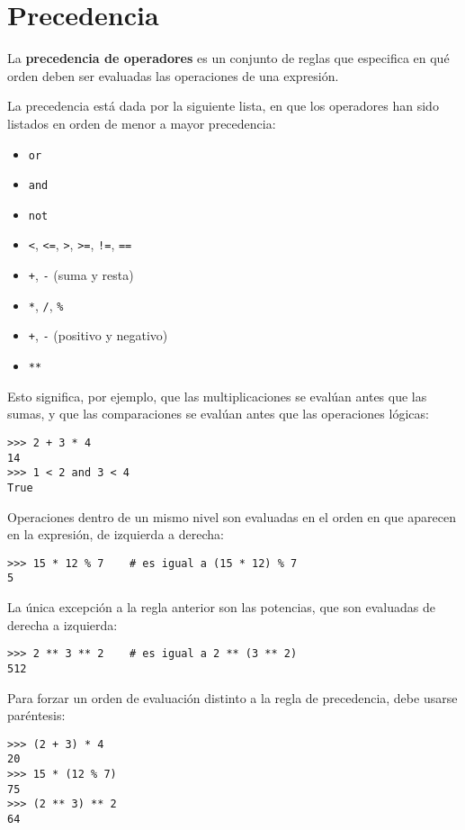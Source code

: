 \section{Precedencia}

La \textbf{precedencia de operadores} es un conjunto de reglas que
especifica en qué orden deben ser evaluadas las operaciones de una
expresión.

La precedencia está dada por la siguiente lista, en que los operadores
han sido listados en orden de menor a mayor precedencia:

\begin{itemize}
\item
  \lstinline!or!
\item
  \lstinline!and!
\item
  \lstinline!not!
\item
  \lstinline!<!, \lstinline!<=!, \lstinline!>!, \lstinline!>=!,
  \lstinline"!=", \lstinline!==!
\item
  \lstinline!+!, \lstinline!-! (suma y resta)
\item
  \lstinline!*!, \lstinline!/!, \lstinline!%!
\item
  \lstinline!+!, \lstinline!-! (positivo y negativo)
\item
  \lstinline!**!
\end{itemize}

Esto significa, por ejemplo, que las multiplicaciones se evalúan antes
que las sumas, y que las comparaciones se evalúan antes que las
operaciones lógicas:
\begin{lstlisting}
>>> 2 + 3 * 4
14
>>> 1 < 2 and 3 < 4
True
\end{lstlisting}
Operaciones dentro de un mismo nivel son evaluadas en el orden en que
aparecen en la expresión, de izquierda a derecha:
\begin{lstlisting}
>>> 15 * 12 % 7    # es igual a (15 * 12) % 7
5
\end{lstlisting}
La única excepción a la regla anterior son las potencias, que son
evaluadas de derecha a izquierda:
\begin{lstlisting}
>>> 2 ** 3 ** 2    # es igual a 2 ** (3 ** 2)
512
\end{lstlisting}

Para forzar un orden de evaluación distinto a la regla de precedencia,
debe usarse paréntesis:
\begin{lstlisting}
>>> (2 + 3) * 4
20
>>> 15 * (12 % 7)
75
>>> (2 ** 3) ** 2
64
\end{lstlisting}

